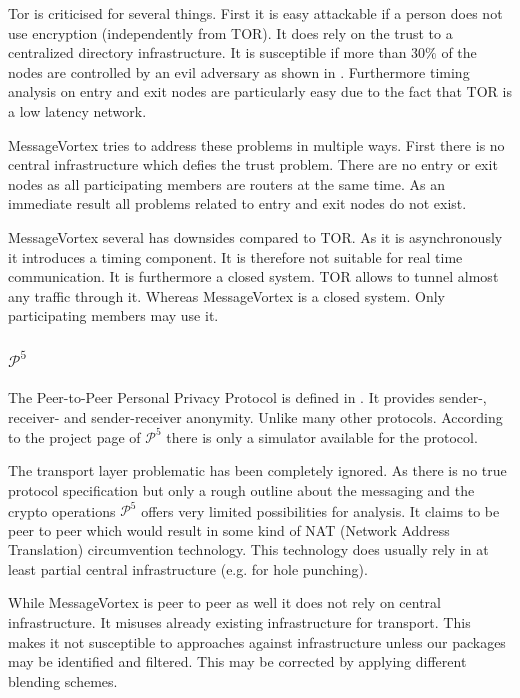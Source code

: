 \documentclass[9pt,journal,compsoc]{IEEEtran}
\begin{document}
Tor is criticised for several things. First it is easy attackable if a person does not use encryption (independently from TOR). It does rely on the trust to a centralized directory infrastructure. It is susceptible if more than $30\%$ of the nodes are controlled by an evil adversary as shown in \cite{jansen2014sniper}. Furthermore timing analysis on entry and exit nodes are particularly easy due to the fact that TOR is a low latency network.

MessageVortex tries to address these problems in multiple ways. First there is no central infrastructure which defies the trust problem. There are no entry or exit nodes as all participating members are routers at the same time. As an immediate result all problems related to entry and exit nodes do not exist. 

MessageVortex several has downsides compared to TOR. As it is asynchronously it introduces a timing component. It is therefore not suitable for real time communication. It is furthermore a closed system. TOR allows to tunnel almost any traffic through it. Whereas MessageVortex is a closed system. Only participating members may use it. 

\subsubsection{$\mathcal{P}^5$}
The Peer-to-Peer Personal Privacy Protocol is defined in \cite{sherwood-protocol}. It provides sender-, receiver- and sender-receiver anonymity. Unlike many other protocols. According to the project page of $\mathcal{P}^5$ there is only a simulator available for the protocol.

The transport layer problematic has been completely ignored. As there is no true protocol specification but only a rough outline about the messaging and the crypto operations $\mathcal{P}^5$ offers very limited possibilities for analysis. It claims to be peer to peer which would result in some kind of NAT (Network Address Translation) circumvention technology. This technology does usually rely in at least partial central infrastructure (e.g. for hole punching). 

While MessageVortex is peer to peer as well it does not rely on central infrastructure. It misuses already existing infrastructure for transport. This makes it not susceptible to approaches against infrastructure unless our packages may be identified and filtered. This may be corrected by applying different blending schemes. 
\end{document}
